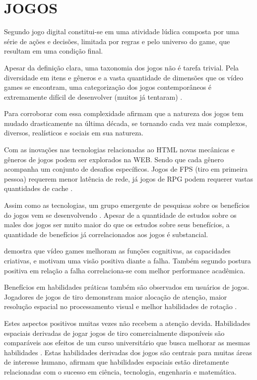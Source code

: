 \section{JOGOS}

Segundo \autocite{indieGamesLemes} jogo digital constitui-se em uma
atividade lúdica composta por uma série de ações e decisões,
limitada por regras e pelo universo do game, que resultam em uma
condição final.

Apesar da definição clara, uma taxonomia dos jogos não é tarefa
trivial. Pela diversidade em itens e gêneros e a vasta quantidade de
dimensões que os vídeo games se encontram, uma categorização dos
jogos contemporâneos é extremamente difícil de desenvolver (muitos
já tentaram) \autocite[pp. 60]{gamebenefits}.

Para corroborar com essa complexidade \cite{gamebenefits} afirmam que
a natureza dos jogos tem mudado drasticamente na última década, se
tornando cada vez mais complexos, diversos, realísticos e sociais em
sua natureza.

Com as inovações nas tecnologias relacionadas ao HTML novas
mecânicas e gêneros de jogos podem ser explorados na WEB. Sendo
que cada gênero acompanha um conjunto de desafios específicos.
Jogos de FPS (tiro em primeira pessoa) requerem menor latência de
rede, já jogos de RPG podem requerer vastas quantidades de cache
\autocite{html5mostwanted}.

Assim como as tecnologias, um grupo emergente de pesquisas sobre os benefícios do jogos vem se desenvolvendo \cite{gamebenefits}.
Apesar de a quantidade de estudos sobre os males dos jogos ser
muito maior do que os estudos sobre seus benefícios, a quantidade de
benefícios já correlacionados aos jogos é substancial.

\autocite{gamebenefits} demostra que vídeo games melhoram as funções
cognitivas, as capacidades criativas, e motivam uma visão positiva
diante a falha. Também segundo \autocite{gamebenefits} postura positiva
em relação a falha correlaciona-se com melhor performance acadêmica.

Benefícios em habilidades práticas também são observados em
usuários de jogos. Jogadores de jogos de tiro demonstram maior
alocação de atenção, maior resolução espacial no processamento
visual e melhor habilidades de rotação \autocite{gamebenefits}.

Estes aspectos positivos muitas vezes não recebem a atenção devida.
Habilidades espaciais derivadas de jogar jogos de tiro comercialmente
disponíveis são comparáveis aos efeitos de um curso universitário
que busca melhorar as mesmas habilidades \autocite{gamebenefits}. Estas
habilidades derivadas dos jogos são centrais para muitas áreas de
interesse humano, \cite{gamebenefits} afirmam que habilidades espaciais
estão diretamente relacionadas com o sucesso em ciência, tecnologia,
engenharia e matemática.

